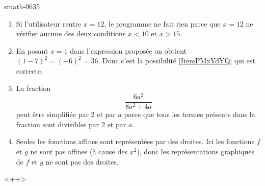 
\begin{corrige}{smath-0635}

    \begin{enumerate}
        \item
            Si l'utilisateur rentre \( x=12\), le programme ne fait rien parce que \( x=12\) ne vérifier aucune des deux conditions \( x<10\) et \( x>15\).
        \item
            En posant \( x=1\) dans l'expression proposée on obtient \( (1-7)^2=(-6)^2=36\). Donc c'est la possibilité \ref{ItemPMxYdYQ} qui est correcte.
        \item
            La fraction 
            \begin{equation}
                \frac{ 6a^2 }{ 8a^2+4a }
            \end{equation}
            peut être simplifiée par \( 2\) et par \( a\) parce que tous les termes présents dans la fraction sont divisibles par \( 2\) et par \( a\).
        \item
            Seules les fonctions affines sont représentées par des droites. Ici les fonctions \( f\) et \( g\) ne sont pas affines (à cause des \( x^2\)), donc les représentations graphiques de \( f\) et \( g\) ne sont pas des droites.
    \end{enumerate}
    <++>

\end{corrige}

